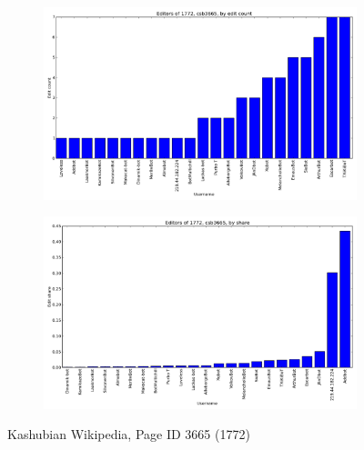 \begin{figure}
   \centering
    \begin{subfigure}[b]{0.5\linewidth}
      \centering
      \includegraphics[width=\linewidth]{img/editshare/csb3665count.png}
    \end{subfigure}
    \begin{subfigure}[b]{0.5\linewidth}
      \centering
      \includegraphics[width=\linewidth]{img/editshare/csb3665share.png}
    \end{subfigure}
    \caption{Kashubian Wikipedia, Page ID 3665 (1772)}
\end{figure}
